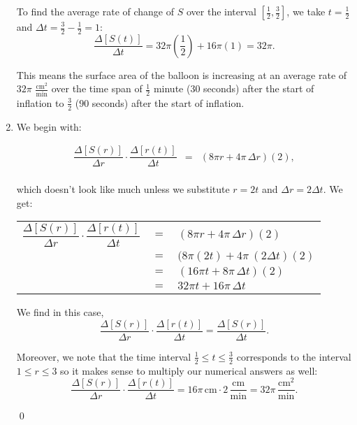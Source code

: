 \documentclass{ximera}
\begin{document}
\begin{example}
\begin{enumerate}
To find the average rate of change of $S$ over the interval $\left[\frac{1}{2}, \frac{3}{2}\right]$, we take $t = \frac{1}{2}$ and $\Delta t = \frac{3}{2} - \frac{1}{2} = 1$: \[\frac{\Delta[S(t)]}{\Delta t} = 32 \pi \left(\frac{1}{2}\right) + 16 \pi (1) = 32 \pi.\]

\medskip

This means the surface area of the balloon  is increasing at an average rate of $32 \pi$ $\frac{\text{cm}^2}{\text{min}}$ over the time span of $\frac{1}{2}$ minute ($30$ seconds) after the start of inflation to $\frac{3}{2}$ ($90$ seconds) after the start of inflation.

                          
\item  We begin with: 
 
\[ \begin{array}{rcl}

\dfrac{\Delta[S(r)]}{\Delta r}  \cdot \dfrac{\Delta[r(t)]}{\Delta t} & = & (8 \pi r + 4 \pi \, \Delta r)(2),   \\ \end{array} \]

 which doesn't look like much unless we substitute $r = 2t$ and $\Delta r = 2 \Delta t$.  We get:

\begin{longtable}{rcl}

$\dfrac{\Delta[S(r)]}{\Delta r}  \cdot \dfrac{\Delta[r(t)]}{\Delta t}$ & $=$ & $(8 \pi r + 4 \pi \, \Delta r)(2)$   \\[10pt]
                 & $=$ & $(8 \pi (2t) + 4 \pi \ (2 \Delta t)(2)$\\[10pt]
                 & $=$ & $(16 \pi t + 8 \pi \,  \Delta t)(2)$\\[10pt]
                  & $=$ & $32 \pi t + 16 \pi \,  \Delta t$ \\ \end{longtable} 
                     
We find in this case,   \[ \dfrac{\Delta[S(r)]}{\Delta r}  \cdot \dfrac{\Delta[r(t)]}{\Delta t}   =  \dfrac{\Delta[S(r)]}{\Delta t}.\] 

Moreover, we note that the time interval $\frac{1}{2} \leq t \leq \frac{3}{2}$ corresponds to the interval $1 \leq r \leq 3$ so it makes sense to multiply our numerical answers as well: \[ \dfrac{\Delta[S(r)]}{\Delta r}  \cdot \dfrac{\Delta[r(t)]}{\Delta t} = 16 \pi \, \text{cm} \cdot 2 \, \frac{\text{cm}}{\text{min}} = 32 \pi \, \frac{\text{cm}^2}{\text{min}}.\]

\hfill \qed
	 
\end{enumerate}


\end{example}
\end{document}
